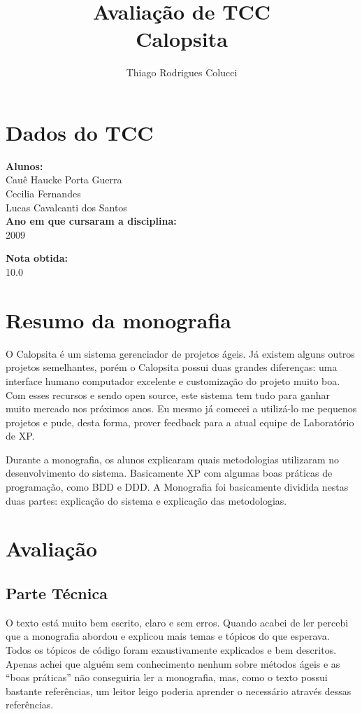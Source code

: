 \documentclass[12pt,a4paper]{article}
\title{Avaliação de TCC\\Calopsita}
\author{Thiago Rodrigues Colucci}
\begin{document}
\maketitle

\newpage

\tableofcontents
\newpage
\section{Dados do TCC}
\textbf{Alunos:}\\
Cauê Haucke Porta Guerra\\
Cecilia Fernandes\\
Lucas Cavalcanti dos Santos\\


\textbf{Ano em que cursaram a disciplina:}\\2009


\textbf{Nota obtida:}\\10.0


\section{Resumo da monografia}

O Calopsita é um sistema gerenciador de projetos ágeis. Já existem alguns outros projetos semelhantes, porém o Calopsita possui duas grandes diferenças: uma interface humano computador excelente e customização do projeto muito boa. Com esses recursos e sendo open source, este sistema tem tudo para ganhar muito mercado nos próximos anos. Eu mesmo já comecei a utilizá-lo me pequenos projetos e pude, desta forma, prover feedback para a atual equipe de Laboratório de XP.

Durante a monografia, os alunos explicaram quais metodologias utilizaram no desenvolvimento do sistema. Basicamente XP com algumas boas práticas de programação, como BDD e DDD. A Monografia foi basicamente dividida nestas duas partes: explicação do sistema e explicação das metodologias.

\section{Avaliação}
\subsection{Parte Técnica}
O texto está muito bem escrito, claro e sem erros. Quando acabei de ler percebi que a monografia abordou e explicou mais temas e tópicos do que esperava. Todos os tópicos de código foram exaustivamente explicados e bem descritos. Apenas achei que alguém sem conhecimento nenhum sobre métodos ágeis e as ``boas práticas'' não conseguiria ler a monografia, mas, como o texto possui bastante referências, um leitor leigo poderia aprender o necessário através dessas referências.
\end{document}
